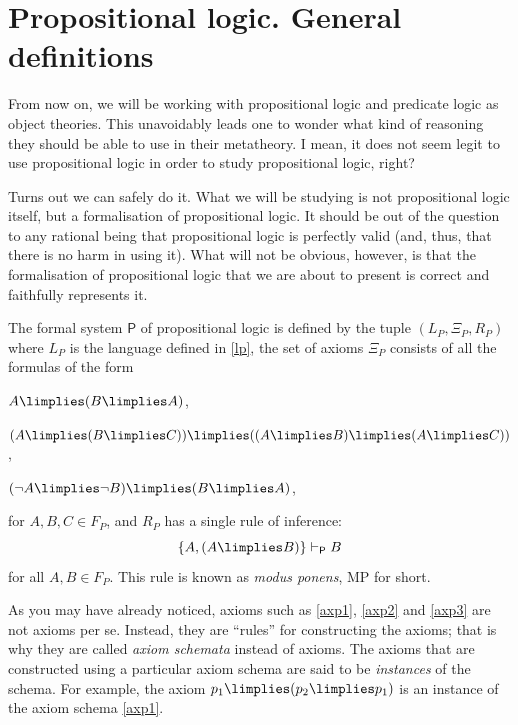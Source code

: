 
\section{Propositional logic. General definitions}

\begin{para}
From now on, we will be working with propositional logic and predicate logic as object theories.
This unavoidably leads one to wonder what kind of reasoning they should be able to use in their metatheory.
I mean, it does not seem legit to use propositional logic in order to study propositional logic, right?

Turns out we can safely do it.
What we will be studying is not propositional logic itself, but a formalisation of propositional logic.
It should be out of the question to any rational being that propositional logic is perfectly valid (and, thus, that there is no harm in using it).
What will not be obvious, however, is that the formalisation of propositional logic that we are about to present is correct and faithfully represents it.
\end{para}

\begin{definition}
The formal system $\mathsf{P}$ of propositional logic is defined by the tuple $(L_P,\Xi_P,R_P)$ where $L_P$ is the language defined in \ref{lp}, the set of axioms $\Xi_P$ consists of all the formulas of the form
\begin{axioms}[P]
\item \label{axp1} $A\limplies (B \limplies A)$,
\item \label{axp2} $(A\limplies(B\limplies C))\limplies ((A\limplies B)\limplies (A\limplies C))$,
\item \label{axp3} $(\lnot A \limplies \lnot B) \limplies (B\limplies A)$,
\end{axioms}
for $A,B,C\in F_P$, and $R_P$ has a single rule of inference:
\[ \{A,(A\limplies B)\} \vdash_{\mathsf{P}} B\]
for all $A,B\in F_P$. This rule is known as \emph{modus ponens}, MP for short.
\end{definition}

\begin{para}
As you may have already noticed, axioms such as \ref{axp1}, \ref{axp2} and \ref{axp3} are not axioms per se. Instead, they are ``rules'' for constructing the axioms; that is why they are called \emph{axiom schemata} instead of axioms. The axioms that are constructed using a particular axiom schema are said to be \emph{instances} of the schema. For example, the axiom $p_1\limplies (p_2\limplies p_1)$ is an instance of the axiom schema \ref{axp1}.
\end{para}

